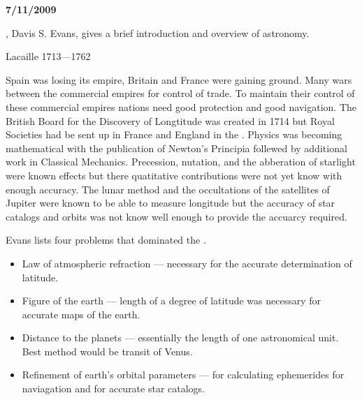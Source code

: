 

{\bf 7/11/2009}

, Davis S. Evans, \cite{Evans1992}
gives a brief introduction and overview of  astronomy.

Lacaille 1713---1762

Spain was losing its empire, Britain and France were gaining ground.
Many wars between the commercial empires for control of trade.  To
maintain their control of these commercial empires nations need good
protection and good navigation.  The British Board for the Discovery
of Longtitude was created in 1714 but Royal Societies had be sent up
in France and England in the .  Physics was becoming
mathematical with the publication of Newton's Principia follewed by
additional work in Classical Mechanics. Precession, nutation, and the
abberation of starlight were known effects but there quatitative
contributions were not yet know with enough accuracy.  The lunar
method and the occultations of the satellites of Jupiter were known
to be able to measure longitude but the accuracy of star catalogs and
orbits was not know well enough to provide the accuarcy required.

Evans lists four problems that dominated the .

\begin{itemize}

\item Law of atmospheric refraction --- necessary for the accurate
  determination of latitude.

\item Figure of the earth --- length of a degree of latitude was necessary
  for accurate maps of the earth.

\item Distance to the planets --- essentially the length of one
  astronomical unit.  Best method would be transit of Venus.

\item Refinement of earth's orbital parameters --- for calculating
ephemerides for naviagation and for accurate star catalogs.

\end{itemize}

